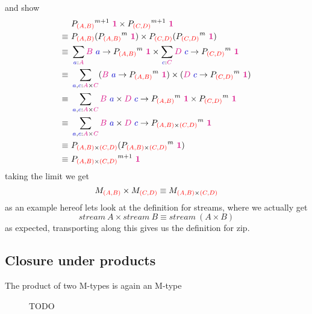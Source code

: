 \documentclass[twoside,11pt,openright]{report}
\newcommand*{\term}[1]{\textcolor{blue!80!black}{#1}}
\newcommand*{\type}[1]{\textcolor{magenta!90!black}{#1}}
\newcommand*{\container}[1]{\textcolor{red}{#1}}
\newcommand*{\unit}{\type{\textbf{1}}}
\begin{document}
and show 
\begin{align}
  &~ {P_{\container{(A,B)}}}^{m+1}~\unit \times {P_{\container{(C,D)}}}^{m+1}~\unit \\
   \equiv&~ P_{\container{(A,B)}} ({P_{\container{(A,B)}}}^m~\unit) \times P_{\container{(C,D)}} ({P_{\container{(C,D)}}}^m~\unit) \\
   \equiv&~ \sum_{\term{a} : \type{A}} \type{B}~\term{a} \rightarrow {P_{\container{(A,B)}}}^m~\unit \times \sum_{\term{c} : \type{C}} \type{D}~\term{c} \rightarrow {P_{\container{(C,D)}}}^m~\unit \\
  \equiv&~ \sum_{\term{a} , \term{c} : \type{A} \times \type{C}} (\type{B}~\term{a} \rightarrow {P_{\container{(A,B)}}}^m~\unit) \times (\type{D}~\term{c} \rightarrow {P_{\container{(C,D)}}}^m~\unit) \\
  \equiv&~ \sum_{\term{a} , \term{c} : \type{A} \times \type{C}} \type{B}~\term{a} \times \type{D}~\term{c} \rightarrow {P_{\container{(A,B)}}}^m~\unit \times {P_{\container{(C,D)}}}^m~\unit \\
  \equiv&~ \sum_{\term{a} , \term{c} : \type{A} \times \type{C}} \type{B}~\term{a} \times \type{D}~\term{c} \rightarrow {P_{\container{(A,B)} \times \container{(C,D)}}}^m~\unit \\
  \equiv&~ P_{\container{(A,B)} \times \container{(C,D)}} ({P_{\container{(A,B)} \times \container{(C,D)}}}^m~\unit) \\
  \equiv&~ {P_{\container{(A,B)} \times \container{(C,D)}}}^{m+1}~\unit
\end{align}
taking the limit we get
\begin{equation}
  M_{\container{(A,B)}} \times M_{\container{(C,D)}} \equiv M_{\container{(A,B)} \times \container{(C,D)}}
\end{equation}
as an example hereof lets look at the definition for streams, where we actually get
\begin{equation}
  stream~A \times stream~B \equiv stream~(A \times B)
\end{equation}
as expected, transporting along this gives us the definition for zip.

\subsection{Closure under products}
The product of two M-types is again an M-type

\begin{figure}[h]
  \centering
  \caption{TODO}
\end{figure}
\end{document}
